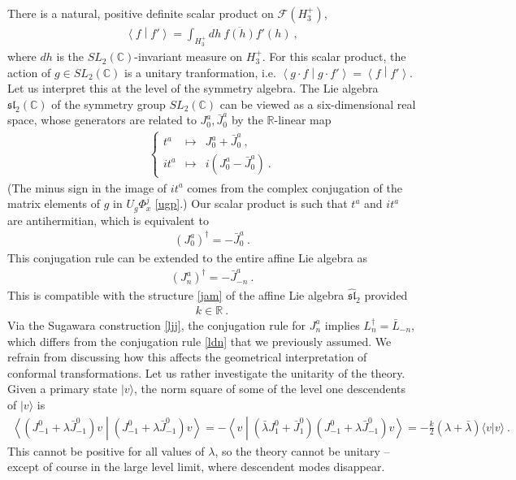\documentclass[12pt, a4paper, notitlepage, twoside]{report}
\numberwithin{equation}{section}
\theoremstyle{break}
\begin{document}
There is a natural, positive definite scalar product on $\mathcal{F}(H_3^+)$, 
\begin{align}
 \left\langle f \middle| f' \right\rangle = \int_{H_3^+} dh\ \overline{f(h)} f'(h)\ ,
\end{align}
where $dh$ is the $SL_2({\mathbb{C}})$-invariant measure on $H_3^+$.
For this scalar product, the action of $g\in SL_2({\mathbb{C}})$ is a unitary tranformation, i.e. $\left\langle g\cdot f \middle| g\cdot f'\right\rangle = \left\langle f \middle| f'\right\rangle $.
Let us interpret this at the level of the symmetry algebra.
The Lie algebra $\mathfrak{sl}_2({\mathbb{C}})$ of the symmetry group $SL_2({\mathbb{C}})$ can be viewed as a six-dimensional real space, whose generators are related to $J^a_0, \bar{J}^a_0$ by the ${\mathbb{R}}$-linear map
\begin{align}
 \left\{\begin{array}{lcl} t^a & \mapsto & J_0^a + \bar{J}_0^a \ ,  \\ it^a & \mapsto & i(J^a_0 - \bar{J}^a_0)\ . \end{array}\right. 
\end{align}
(The minus sign in the image of $it^a$ comes from the complex conjugation of the matrix elements of $g$ in $U_g\Phi^j_{x}$ \eqref{ugp}.)
Our scalar product is such that $t^a$ and $it^a$ are antihermitian, which is equivalent to
\begin{align}
 (J^a_0)^\dagger = -\bar{J}^a_0\ .
\label{jzd}
\end{align}
This conjugation rule can be extended to the entire affine Lie algebra as 
\begin{align}
 \boxed{(J^a_n)^\dagger = -\bar{J}^a_{-n}}\ .
\label{jdj}
\end{align}
This is compatible with the structure \eqref{jam} of the affine Lie algebra $\hat{\mathfrak{sl}}_2$ provided 
\begin{align}
 k\in\mathbb{R}\ .
\label{kir}
\end{align}
Via the Sugawara construction \eqref{ljj}, the conjugation rule for $J^a_n$ implies $L_n^\dagger = \bar{L}_{-n}$, which differs from the conjugation rule \eqref{ldn} that we previously assumed. 
We refrain from discussing how this affects the geometrical interpretation of conformal transformations.
Let us rather investigate the unitarity of the theory. 
Given a primary state $|v\rangle$, the norm square of some of the level one descendents of $|v\rangle$ is
\begin{align}
 \left\langle (J^0_{-1}+\lambda\bar{J}^0_{-1})v \middle| (J^0_{-1}+\lambda\bar{J}^0_{-1})v \right\rangle
= -\left\langle v \middle| (\bar{\lambda} J^0_1+\bar{J}^0_1)(J^0_{-1}+\lambda\bar{J}^0_{-1})v \right\rangle 
= -\frac{k}{2}(\lambda+\bar{\lambda}) \langle v| v\rangle\ .
\label{viv}
\end{align}
This cannot be positive for all values of $\lambda$,  
so the theory cannot be unitary -- except of course in the large level limit, where descendent modes disappear. 
\end{document}
